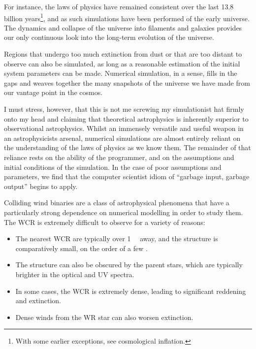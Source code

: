 For instance, the laws of physics have remained consistent over the last 13.8 billion years\footnote{With some earlier exceptions, see cosmological inflation.}, and as such simulations have been performed of the early universe.
The dynamics and collapse of the universe into filaments and galaxies provides our only continuous look into the long-term evolution of the universe.

Regions that undergo too much extinction from dust or that are too distant to observe can also be simulated, as long as a reasonable estimation of the initial system parameters can be made.
Numerical simulation, in a sense, fills in the gaps and weaves together the many snapshots of the universe we have made from our vantage point in the cosmos.

I must stress, however, that this is not me screwing my simulationist hat firmly onto my head and claiming that theoretical astrophysics is inherently superior to observational astrophysics.
Whilst an immensely versatile and useful weapon in an astrophysicists arsenal, numerical simulations are almost entirely reliant on the understanding of the laws of physics as we know them.
The remainder of that reliance rests on the ability of the programmer, and on the assumptions and initial conditions of the simulation.
In the case of poor assumptions and parameters, we find that the computer scientist idiom of ``garbage input, garbage output'' begins to apply.


Colliding wind binaries are a class of astrophysical phenomena that have a particularly strong dependence on numerical modelling in order to study them.
The WCR is extremely difficult to observe for a variety of reasons:

\begin{itemize}
  \item The nearest WCR are typically over \SI{1}{\kilo\parsec} away, and the structure is comparatively small, on the order of a few \si{\au}.
  \item The structure can also be obscured by the parent stars, which are typically brighter in the optical and UV spectra.
  \item In some cases, the WCR is extremely dense, leading to significant reddening and extinction.
  \item Dense winds from the WR star can also worsen extinction.
\end{itemize}

